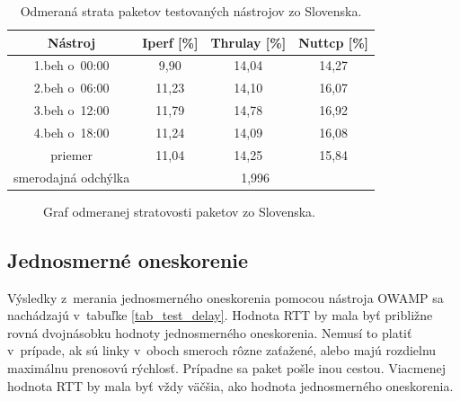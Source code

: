     \begin{table}[h!]
        \begin{center}
            \begin{tabular}{|c|c|c|c|}
                \hline
                Nástroj & Iperf [\%]&  Thrulay [\%]& Nuttcp [\%]\\ 
                \hline
                1.beh o~00:00 & 9,90 & 14,04 & 14,27 \\
                \hline
                2.beh o~06:00 & 11,23 & 14,10 & 16,07 \\
                \hline
                3.beh o~12:00 & 11,79 & 14,78 &  16,92 \\
                \hline
                4.beh o~18:00 & 11,24 & 14,09 & 16,08 \\
                \hline
                priemer       & 11,04 & 14,25 & 15,84 \\
                \hline
                smerodajná odchýlka & \multicolumn{3}{c|}{1,996}\\
                \hline
            \end{tabular}
            \caption{Odmeraná strata paketov testovaných nástrojov zo Slovenska.} 
            \label{tab_test_loss_sk}
        \end{center}
    \end{table}
   \begin{figure}[H]
       \begin{center}
               \caption{Graf odmeranej stratovosti paketov zo Slovenska.}
           \label{tab_test_loss_sk_graf}
       \end{center}
   \end{figure}

        \subsection{Jednosmerné oneskorenie} \label{test_vys_ones}
        Výsledky z~merania jednosmerného oneskorenia pomocou nástroja OWAMP sa
        nachádzajú v~tabuľke \ref{tab_test_delay}. Hodnota RTT by mala byť približne 
        rovná dvojnásobku hodnoty jednosmerného oneskorenia. Nemusí to platiť
        v~prípade, ak sú linky v~oboch smeroch rôzne zaťažené, alebo majú
        rozdielnu maximálnu prenosovú rýchlosť. Prípadne sa paket pošle inou
        cestou. Viacmenej hodnota RTT by mala byť vždy väčšia, ako hodnota
        jednosmerného oneskorenia.
        
